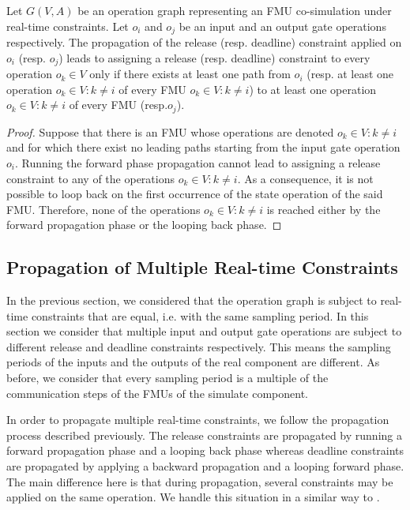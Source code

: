 \begin{lemma}
Let $G(V,A)$ be an operation graph representing an FMU co-simulation under real-time constraints. Let $o_i$ and $o_j$ be an input and an output gate operations respectively. The propagation of the release (resp. deadline) constraint applied on $o_i$ (resp. $o_j$) leads to assigning a release (resp. deadline) constraint to every operation $o_k \in V$ only if there exists at least one path from $o_i$ (resp. at least one operation $o_k \in  V : k \neq i$ of every FMU $o_k \in  V : k \neq i$) to at least one operation $o_k \in  V : k \neq i$ of every FMU (resp.$o_j$).  
\label{lem:coverage}
\end{lemma}

\begin{proof}
Suppose that there is an FMU whose operations are denoted $o_k \in  V : k \neq i$ and for which there exist no leading paths starting from the input gate operation $o_i$. Running the forward phase propagation cannot lead to assigning a release constraint to any of the operations $o_k \in  V : k \neq i$. As a consequence, it is not possible to loop back on the first occurrence of the state operation of the said FMU. Therefore, none of the operations $o_k \in  V : k \neq i$ is reached either by the forward propagation phase or the looping back phase.      
\end{proof}

\subsection{Propagation of Multiple Real-time Constraints}

In the previous section, we considered that the operation graph is subject to real-time constraints that are equal, i.e. with the same sampling period. In this section we consider that multiple input and output gate operations are subject to different release and deadline constraints respectively. This means the sampling periods of the inputs and the outputs of the real component are different. As before, we consider that every sampling period is a multiple of the communication steps of the FMUs of the simulate component.

In order to propagate multiple real-time constraints, we follow the propagation process described previously. The release constraints are propagated by running a forward propagation phase and a looping back phase whereas deadline constraints are propagated by applying a backward propagation and a looping forward phase. The main difference here is that during propagation, several constraints may be applied on the same operation. We handle this situation in a similar way to \cite{faure:2011}.

